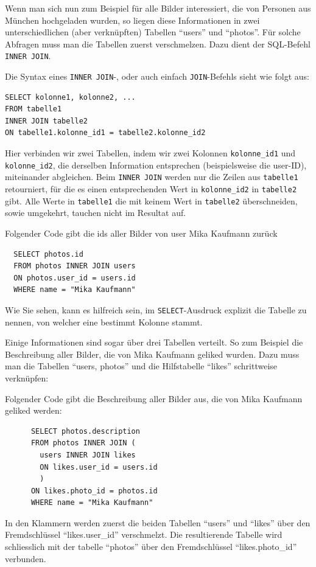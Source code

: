 Wenn man sich nun zum Beispiel für alle Bilder interessiert, die von Personen aus München hochgeladen wurden, so liegen diese Informationen in zwei unterschiedlichen (aber verknüpften) Tabellen \enquote{users} und \enquote{photos}. Für solche Abfragen muss man die Tabellen zuerst verschmelzen. Dazu dient der SQL-Befehl \lstinline|INNER JOIN|.

Die Syntax eines \lstinline|INNER JOIN|-, oder auch einfach \lstinline|JOIN|-Befehls sieht wie folgt aus:

\begin{lstlisting}
SELECT kolonne1, kolonne2, ...
FROM tabelle1
INNER JOIN tabelle2
ON tabelle1.kolonne_id1 = tabelle2.kolonne_id2
\end{lstlisting}
Hier verbinden wir zwei Tabellen, indem wir zwei Kolonnen \texttt{kolonne\_id1} und \texttt{kolonne\_id2}, die derselben Information entsprechen (beispielsweise die user-ID), miteinander abgleichen. Beim \lstinline|INNER JOIN| werden nur die Zeilen aus \texttt{tabelle1} retourniert, für die es einen entsprechenden Wert in \texttt{kolonne\_id2} in \texttt{tabelle2} gibt. Alle Werte in \texttt{tabelle1} die mit keinem Wert in \texttt{tabelle2} überschneiden, sowie umgekehrt, tauchen nicht im Resultat auf.

\begin{myexample}
  Folgender Code gibt die ids aller Bilder von user Mika Kaufmann zurück
  \begin{lstlisting}
  SELECT photos.id
  FROM photos INNER JOIN users 
  ON photos.user_id = users.id 
  WHERE name = "Mika Kaufmann"
  \end{lstlisting}
  
  Wie Sie sehen, kann es hilfreich sein, im \lstinline|SELECT|-Ausdruck explizit die Tabelle zu nennen, von welcher eine bestimmt Kolonne stammt.
  \end{myexample}

  Einige Informationen sind sogar über drei Tabellen verteilt. So zum Beispiel die Beschreibung aller Bilder, die von Mika Kaufmann geliked wurden. Dazu muss man die Tabellen \enquote{users, photos} und die Hilfstabelle \enquote{likes} schrittweise verknüpfen:

  \begin{myexample}
    Folgender Code gibt die Beschreibung aller Bilder aus, die von Mika Kaufmann geliked werden:
    \begin{lstlisting}
      SELECT photos.description
      FROM photos INNER JOIN (
        users INNER JOIN likes
        ON likes.user_id = users.id
        )
      ON likes.photo_id = photos.id 
      WHERE name = "Mika Kaufmann"
    \end{lstlisting}
    
    In den Klammern werden zuerst die beiden Tabellen \enquote{users} und \enquote{likes} über den Fremdschlüssel \enquote{likes.user\_id} verschmelzt. Die resultierende Tabelle wird schliesslich mit der tabelle \enquote{photos} über den Fremdschlüssel \enquote{likes.photo\_id} verbunden.
    \end{myexample}

